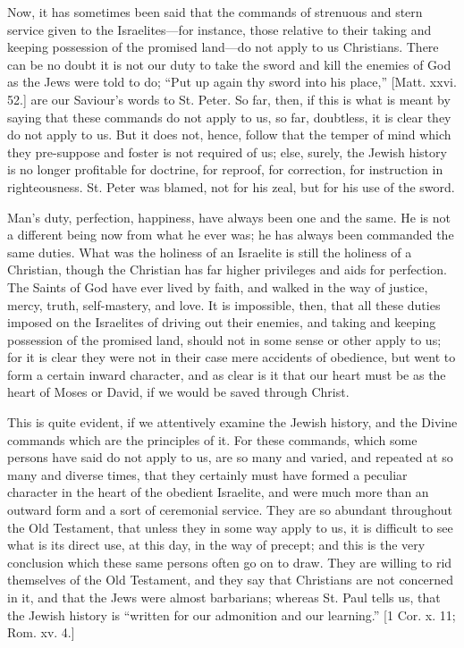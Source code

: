 Now, it has sometimes been said that the commands of strenuous and
stern service given to the Israelites—for instance, those relative to
their taking and keeping possession of the promised land—do not
apply to us Christians. There can be no doubt it is not our duty to
take the sword and kill the enemies of God as the Jews were told to
do; ``Put up again thy sword into his place,'' [Matt. xxvi.
52.] are our Saviour's words to St. Peter. So far, then, if this is
what is meant by saying that these commands do not apply to us, so
far, doubtless, it is clear they do not apply to us. But it does not,
hence, follow that the temper of mind which they pre-suppose and
foster is not required of us; else, surely, the Jewish history is no
longer profitable for doctrine, for reproof, for correction, for
instruction in righteousness. St. Peter was blamed, not for his zeal,
but for his use of the sword.

Man's duty, perfection, happiness, have always been one and the
same. He is not a different being now from what he ever was; he has
always been commanded the same duties. What was the holiness of an
Israelite is still the holiness of a Christian, though the Christian
has far higher privileges and aids for perfection. The Saints of God
have ever lived by faith, and walked in the way of justice, mercy,
truth, self-mastery, and love. It is impossible, then, that all these
duties imposed on the Israelites of driving out their enemies, and
taking and keeping possession of the promised land, should not in some
sense or other apply to us; for it is clear they were not in their
case mere accidents of obedience, but went to form a certain inward
character, and as clear is it that our heart must be as the heart of
Moses or David, if we would be saved through Christ.

This is quite evident, if we attentively examine the Jewish
history, and the Divine commands which are the principles of it. For
these commands, which some persons have said do not apply to us, are
so many and varied, and repeated at so many and diverse times, that
they certainly must have formed a peculiar character in the heart of
the obedient Israelite, and were much more than an outward form and a
sort of ceremonial service. They are so abundant throughout the Old
Testament, that unless they in some way apply to us, it is difficult
to see what is its direct use, at this day, in the way of precept; and
this is the very conclusion which these same persons often go on to
draw. They are willing to rid themselves of the Old Testament, and
they say that Christians are not concerned in it, and that the Jews
were almost barbarians; whereas St. Paul tells us, that the Jewish
history is ``written for our admonition and our learning.'' [1
Cor. x. 11; Rom. xv. 4.]

